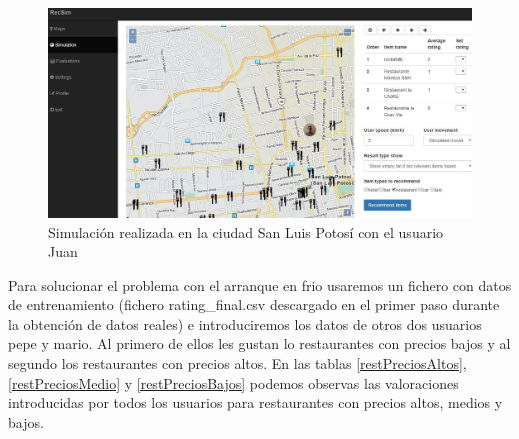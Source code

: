 \begin{figure}[H]
	\centering\includegraphics[scale=0.35]{imagenes/explotacion/simulacion/simulacion-juan.jpg}
	\caption{Simulación realizada en la ciudad San Luis Potosí con el usuario Juan}
	\label{simulacionJuan}
\end{figure}

Para solucionar el problema con el arranque en frio usaremos un fichero con datos de entrenamiento (fichero rating\_final.csv descargado en el primer paso durante la obtención de datos reales) e introduciremos los datos de otros dos usuarios pepe y mario. Al primero de ellos les gustan lo restaurantes con precios bajos y al segundo los restaurantes con precios altos. En las tablas \ref{restPreciosAltos}, \ref{restPreciosMedio} y \ref{restPreciosBajos} podemos observas las valoraciones introducidas por todos los usuarios para restaurantes con precios altos, medios y bajos.

